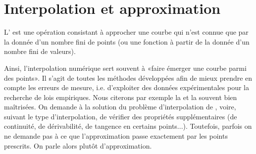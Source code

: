 \chapter{Interpolation et approximation}\label{chap-interpolation} 


\medskip
L' est une opération consistant à approcher une courbe qui n'est connue que par la donnée d'un nombre fini de points (ou une fonction à partir de la donnée d'un nombre fini de valeurs). 

Ainsi, l'interpolation numérique sert souvent à «faire émerger une courbe parmi des points». Il s'agit de toutes les méthodes développées afin de mieux prendre en compte les erreurs de mesure, i.e. d'exploiter des données expérimentales pour la recherche de lois empiriques. Nous citerons par exemple la  et la  souvent bien maîtrisées. On demande à la solution du problème d'interpolation de , voire, suivant le type d'interpolation, de vérifier des propriétés supplémentaires (de continuité, de dérivabilité, de tangence en certains points...). Toutefois, parfois on ne demande pas à ce que l'approximation passe exactement par les points prescrits. On parle alors plutôt d'approximation. 


